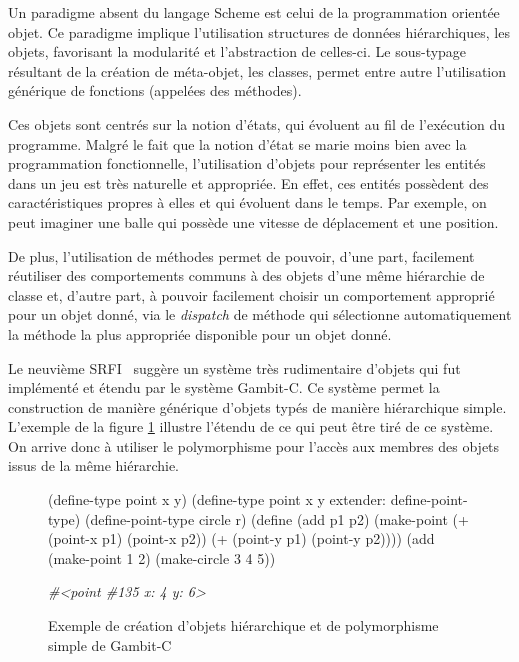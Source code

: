 \documentclass[12pt,oneside,letterpaper,francais]{book}
\newcommand{\schemeresult}[1]{{\it #1}}
\begin{document}
Un paradigme absent du langage Scheme est celui de la programmation
orientée objet. Ce paradigme implique l'utilisation structures de
données hiérarchiques, les objets, favorisant la modularité et
l'abstraction de celles-ci. Le sous-typage résultant de la création de
méta-objet, les classes, permet entre autre l'utilisation générique de
fonctions (appelées des méthodes). 

Ces objets sont centrés sur la notion d'états, qui évoluent au fil de
l'exécution du programme. Malgré le fait que la notion d'état se marie
moins bien avec la programmation fonctionnelle, l'utilisation d'objets
pour représenter les entités dans un jeu est très naturelle et
appropriée. En effet, ces entités possèdent des caractéristiques
propres à elles et qui évoluent dans le temps. Par exemple, on peut
imaginer une balle qui possède une vitesse de déplacement et une
position. 

De plus, l'utilisation de méthodes permet de pouvoir, d'une part,
facilement réutiliser des comportements communs à des objets d'une
même hiérarchie de classe et, d'autre part, à pouvoir facilement
choisir un comportement approprié pour un objet donné, via le
\textit{dispatch} de méthode qui sélectionne automatiquement la
méthode la plus appropriée disponible pour un objet donné.

Le neuvième SRFI~\cite{SRFI_9} suggère un système très rudimentaire
d'objets qui fut implémenté et étendu par le système Gambit-C. Ce
système permet la construction de manière générique d'objets typés de
manière hiérarchique simple. L'exemple de la figure
\ref{OO:gambit-obj} illustre l'étendu de ce qui peut être tiré de ce
système. On arrive donc à utiliser le polymorphisme pour l'accès aux
membres des objets issus de la même hiérarchie.

\begin{figure}[htb!]
  \begin{schemecode}
(define-type point x y)
(define-type point x y extender: define-point-type)
(define-point-type circle r)
(define (add p1 p2) (make-point (+ (point-x p1) (point-x p2))
                                (+ (point-y p1) (point-y p2))))
(add (make-point 1 2) (make-circle 3 4 5))
  \end{schemecode}
  \schemeresult{\#\textless point \#135 x: 4 y: 6\textgreater}
  \caption{Exemple de création d'objets hiérarchique et de
    polymorphisme simple de Gambit-C}
  \label{OO:gambit-obj}
\end{figure}
\end{document}
